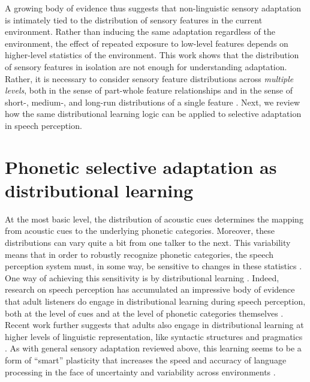 A growing body of evidence thus suggests that non-linguistic sensory adaptation is intimately tied to the distribution of sensory features in the current environment.
Rather than inducing the same adaptation regardless of the environment, the effect of repeated exposure to low-level features depends on higher-level statistics of the environment. 
This work shows that the distribution of sensory features in isolation are not enough for understanding adaptation.  Rather, it is necessary to consider sensory feature distributions across \emph{multiple levels}, both in the sense of part-whole feature relationships \autocite{He2012} and in the sense of short-, medium-, and long-run distributions of a single feature \autocite{Chopin2012}.
Next, we review how the same distributional learning logic can be applied to selective adaptation in speech perception.


\section{Phonetic selective adaptation as distributional learning}
\label{sec:select-adapt-as}

At the most basic level, the distribution of acoustic cues determines the mapping from acoustic cues to the underlying phonetic categories.  Moreover, these distributions can vary quite a bit from one talker to the next.  This variability means that in order to robustly recognize phonetic categories, the speech perception system must, in some way, be sensitive to changes in these statistics \autocite{Kleinschmidt2015,McMurray2011a}.  One way of achieving this sensitivity is by distributional learning
\autocite[for a review of additional means, such as normalization, see][]{WeatherholtzInPress}. 
Indeed, research on speech perception has accumulated an impressive body of evidence that adult listeners do engage in distributional learning during speech perception, both at the level of cues \autocite[e.g., recalibration/perceptual learning,][]{Bertelson2003,Clayards2008,Feldman2013b,Kraljic2007,Munson2011,Norris2003} and at the level of phonetic categories themselves \autocite[e.g. learning novel phonotactic constraints,][]{Dell2004,Warker2006,Warker2009}.  Recent work further suggests that adults also engage in distributional learning at higher levels of linguistic representation, like syntactic structures \autocite{Chang2006,Fine2013,Jaeger2013a,Kamide2012} and pragmatics \autocite{Kurumada2014,Kurumada2012,YildirimInPress}.  As with general sensory adaptation reviewed above, this learning seems to be a form of ``smart'' plasticity that increases the speed and accuracy of language processing in the face of uncertainty and variability across environments \autocite[for review, see][]{Kleinschmidt2015}.

